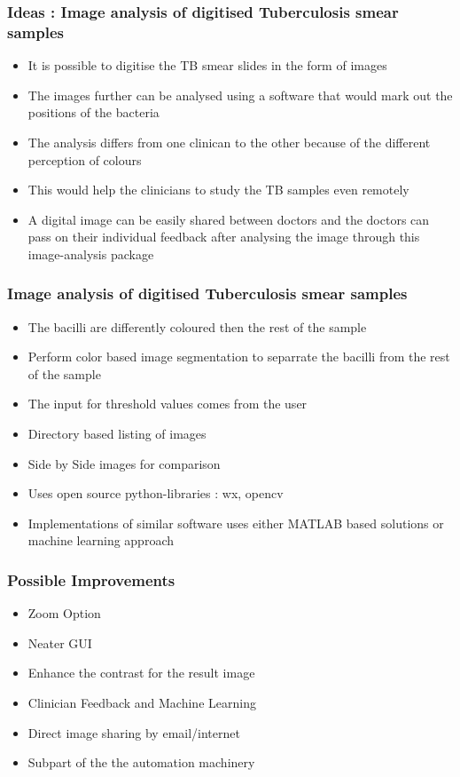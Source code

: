 \documentclass{beamer}
\begin{document}
\begin{frame}
\frametitle{Ideas :  Image analysis of digitised Tuberculosis smear samples}
    \begin{itemize}[<only@+-+(4)>]
        \item  It is possible to digitise the TB smear  slides in the form of images
        \item  The images further can be analysed using a software that would mark out the positions of the bacteria 
        \item  The analysis differs from one clinican to the other because of the different perception of colours
        
        \item  This would help the clinicians to study the TB samples even remotely
        \item A digital image can be easily shared between doctors and the doctors can pass on their individual feedback after analysing the image through this image-analysis package
        

    \end{itemize}
\end{frame}

\begin{frame}
\frametitle{Image analysis of digitised Tuberculosis smear samples}
    \begin{itemize}[<only@+-+(4)>]
	\item The bacilli are differently coloured then the rest of the sample
	\item Perform color based image segmentation to separrate the bacilli from the rest of the sample
	\item The input for threshold values comes from the user
	\item Directory based listing of images
	\item Side by Side images for comparison
	\item Uses open source python-libraries : wx, opencv
	\item Implementations of similar software uses either MATLAB based solutions or machine learning approach
	

    \end{itemize}
\end{frame}

\begin{frame}
\frametitle{Possible Improvements}
    \begin{itemize}[<only@+-+(4)>]
	\item Zoom Option
	\item Neater GUI
	\item Enhance the contrast for the result image
	\item Clinician Feedback and Machine Learning
	\item  Direct image sharing by email/internet
	\item Subpart of the the automation machinery
	
	

    \end{itemize}
        
\end{frame}
\end{document}
